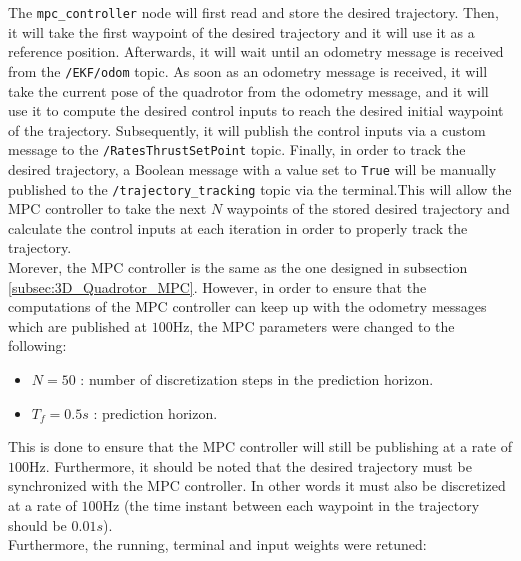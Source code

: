 \documentclass{thesisreport}
\begin{document}
The \texttt{mpc\_controller} node will first read and store the desired trajectory. Then, it will take the first waypoint of the desired trajectory and it will use it as a reference position. Afterwards, it will wait until an odometry message is received from the \texttt{/EKF/odom} topic. As soon as an odometry message is received, it will take the current pose of the quadrotor from the odometry message, and it will use it to compute the desired control inputs to reach the desired initial waypoint of the trajectory. Subsequently, it will publish the control inputs via a custom message to the \texttt{/RatesThrustSetPoint} topic. Finally, in order to track the desired trajectory, a Boolean message with a value set to \texttt{True} will be manually published to the \texttt{/trajectory\_tracking} topic via the terminal.This will allow the MPC controller to take the next $N$ waypoints of the stored desired trajectory and calculate the control inputs at each iteration in order to properly track the trajectory. \\ 

Morever, the MPC controller is the same as the one designed in subsection \ref{subsec:3D_Quadrotor_MPC}. However, in order to ensure that the computations of the MPC controller can keep up with the odometry messages which are published at $100$Hz, the  MPC parameters were changed to the following:

\begin{itemize}
	\item $N = 50$ : number of discretization steps in the prediction horizon.
	\item $T_f = 0.5s$ : prediction horizon.
\end{itemize}

This is done to ensure that the MPC controller will still be publishing at a rate of $100$Hz. Furthermore, it should be noted that the desired trajectory must be synchronized with the MPC controller. In other words it must also be discretized at a rate of $100$Hz (the time instant between each waypoint in the trajectory should be $0.01s$).\\

Furthermore, the running, terminal and input weights were retuned:
\end{document}
